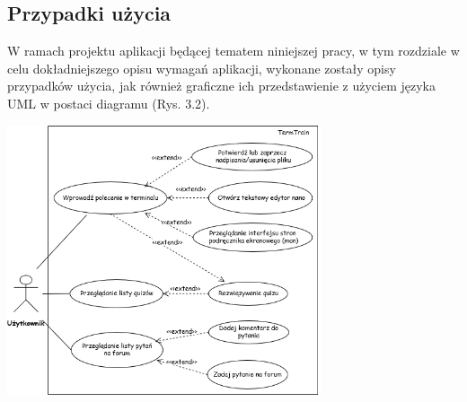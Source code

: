 \documentclass[10pt,a4paper]{report}
\begin{document}
\begin{adjustwidth}{2cm}{2cm}
\section{Przypadki użycia}
\begin{minipage}{1\linewidth}
W ramach projektu aplikacji będącej tematem niniejszej pracy, w tym rozdziale w celu dokładniejszego opisu wymagań aplikacji, wykonane zostały opisy przypadków użycia, jak również graficzne ich przedstawienie z użyciem języka UML w postaci diagramu (Rys. 3.2).
\end{minipage}
\begin{adjustwidth}{-2cm}{-2cm}
 \begin{minipage}{\linewidth}
\vspace{0.2cm}
\begin{center}
  \includegraphics[width=350px]{img/diagram}
\end{center}
\end{minipage}
\end{adjustwidth}

\end{adjustwidth}
\end{document}
